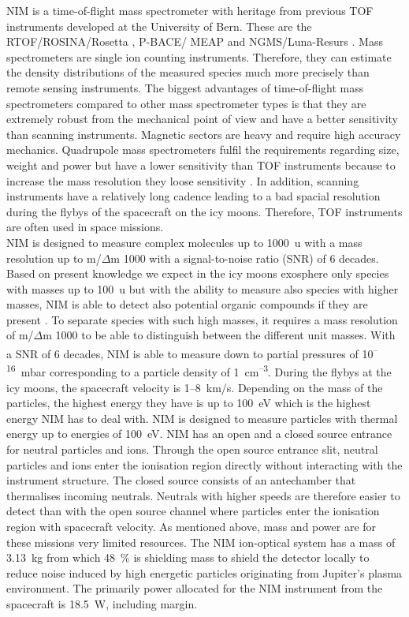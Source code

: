 	NIM is a time-of-flight mass spectrometer with heritage from previous TOF instruments developed at the University of Bern. These are the RTOF/ROSINA/Rosetta \cite{Balsiger2007a,Scherer2006}, P-BACE/ MEAP \cite{Abplanalp2009a} and NGMS/Luna-Resurs \cite{Wurz2012264,Fausch_IEEE}. Mass spectrometers are single ion counting instruments. Therefore, they can estimate the density distributions of the measured species much more precisely than remote sensing instruments. The biggest advantages of time-of-flight mass spectrometers compared to other mass spectrometer types is that they are extremely robust from the mechanical point of view and have a better sensitivity than scanning instruments. Magnetic sectors are heavy and require high accuracy mechanics. Quadrupole mass spectrometers fulfil the requirements regarding size, weight and power but have a lower sensitivity than TOF instruments because to increase the mass resolution they loose sensitivity \cite{Quadrupol_WorkPrinc}. In addition, scanning instruments have a relatively long cadence \cite{MassSpec_Overview} leading to a bad spacial resolution during the flybys of the spacecraft on the icy moons. Therefore, TOF instruments are often used in space missions.\\
	NIM is designed to measure complex molecules up to 1000~u with a mass resolution up to m/$\Delta$m 1000 with a signal-to-noise ratio (SNR) of 6 decades. Based on present knowledge we expect in the icy moons exosphere only species with masses up to 100~u but with the ability to measure also species with higher masses, NIM is able to detect also potential organic compounds if they are present \cite{NIM_Req_dMSNR}. To separate species with such high masses, it requires a mass resolution of m/$\Delta$m 1000 to be able to distinguish between the different unit masses. With a SNR of 6 decades, NIM is able to measure down to partial pressures of 10\textsuperscript{--16}~mbar corresponding to a particle density of 1~cm\textsuperscript{--3}. During the flybys at the icy moons, the spacecraft velocity is 1--8~km/s. Depending on the mass of the particles, the highest energy they have is up to 100~eV which is the highest energy NIM has to deal with. NIM is designed to measure particles with thermal energy up to energies of 100~eV. NIM has an open and a closed source entrance for neutral particles and ions. Through the open source entrance slit, neutral particles and ions enter the ionisation region directly without interacting with the instrument structure. The closed source consists of an antechamber that thermalises incoming neutrals. Neutrals with higher speeds are therefore easier to detect than with the open source channel where particles enter the ionisation region with spacecraft velocity. As mentioned above, mass and power are for these missions very limited resources. The NIM ion-optical system has a mass of 3.13~kg from which 48~\% is shielding mass to shield the detector locally to reduce noise induced by high energetic particles originating from Jupiter's plasma environment. The primarily power allocated for the NIM instrument from the spacecraft is 18.5~W, including margin.

